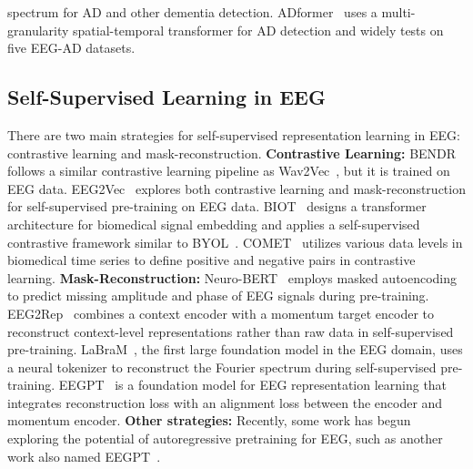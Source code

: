 spectrum for AD and other dementia detection. ADformer~\cite{wang2024adformer} uses a multi-granularity spatial-temporal transformer for AD detection and widely tests on five EEG-AD datasets.





\subsection{Self-Supervised Learning in EEG}
\label{sub:self_supervised_pretrain}

There are two main strategies for self-supervised representation learning in EEG: contrastive learning and mask-reconstruction. \textbf{Contrastive Learning:} BENDR~\cite{kostas2021bendr} follows a similar contrastive learning pipeline as Wav2Vec~\cite{baevski2020wav2vec}, but it is trained on EEG data. EEG2Vec~\cite{zhu2023eeg2vec} explores both contrastive learning and mask-reconstruction for self-supervised pre-training on EEG data. BIOT~\cite{yang2024biot} designs a transformer architecture for biomedical signal embedding and applies a self-supervised contrastive framework similar to BYOL~\cite{grill2020bootstrap}. COMET~\cite{wang2024contrast} utilizes various data levels in biomedical time series to define positive and negative pairs in contrastive learning. \textbf{Mask-Reconstruction:} Neuro-BERT~\cite{wu2024neuro} employs masked autoencoding to predict missing amplitude and phase of EEG signals during pre-training. EEG2Rep~\cite{mohammadi2024eeg2rep} combines a context encoder with a momentum target encoder to reconstruct context-level representations rather than raw data in self-supervised pre-training. LaBraM~\cite{jiang2024large}, the first large foundation model in the EEG domain, uses a neural tokenizer to reconstruct the Fourier spectrum during self-supervised pre-training. EEGPT~\cite{wangeegpt} is a foundation model for EEG representation learning that integrates reconstruction loss with an alignment loss between the encoder and momentum encoder. \textbf{Other strategies:} Recently, some work has begun exploring the potential of autoregressive pretraining for EEG, such as another work also named EEGPT~\cite{yue2024eegpt}.


